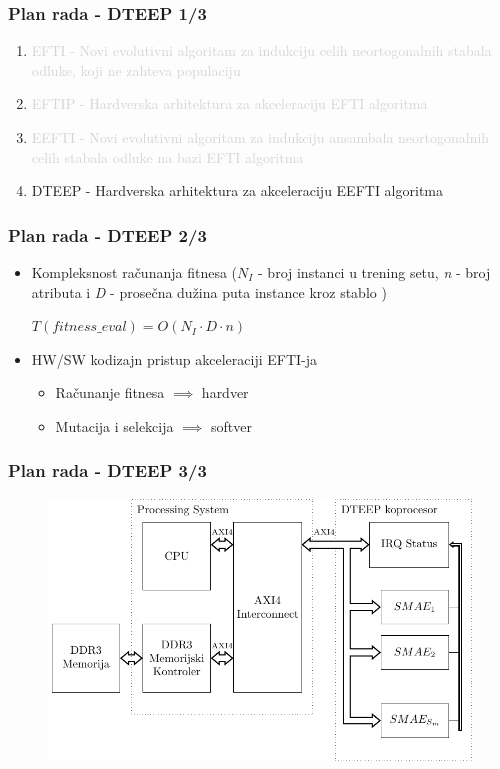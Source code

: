 \documentclass{beamer}
\newcommand{\light}[1]{\textcolor{lightgray}{#1}}
\begin{document}

\begin{frame}
\frametitle{Plan rada - DTEEP 1/3}
\begin{enumerate}
\setlength{\itemsep}{\fill}
\item\light{EFTI - Novi evolutivni algoritam za indukciju celih neortogonalnih stabala
odluke, koji ne zahteva populaciju}
\item\light{EFTIP - Hardverska arhitektura za akceleraciju EFTI algoritma}
\item\light{EEFTI - Novi evolutivni algoritam za indukciju ansambala neortogonalnih celih
stabala odluke na bazi EFTI algoritma}
\item DTEEP - Hardverska arhitektura za akceleraciju EEFTI algoritma
\end{enumerate}
\end{frame}


\begin{frame}
\frametitle{Plan rada - DTEEP 2/3}
\begin{itemize}
\setlength{\itemsep}{\fill}
\item Kompleksnost računanja fitnesa (\(N_{I}\) - broj instanci u trening setu, \emph{n} -
broj atributa i \emph{D} - prosečna dužina puta instance kroz stablo )\\
\vspace{1em}
\centerline{$T(fitness\_eval) = O(N_{I}\cdot D\cdot n)$}
\item HW/SW kodizajn pristup akceleraciji EFTI-ja
\begin{itemize}
\item Računanje fitnesa $\implies$ hardver
\item Mutacija i selekcija $\implies$ softver
\end{itemize}
\end{itemize}
\end{frame}


\begin{frame}[fragile]
\frametitle{Plan rada - DTEEP 3/3}
\begin{figure}
\includegraphics[width=0.9\linewidth]{dteep_architecture.pdf}
\end{figure}
\end{frame}
\end{document}
